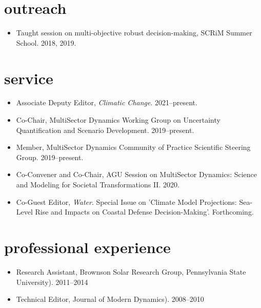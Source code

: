 \documentclass[11pt,article,oneside]{memoir}
\begin{document}

\section{outreach}

\mbox{}\vspace{-\dimexpr\baselineskip\relax}

\begin{itemize}[label={}]

  \item Taught session on multi-objective robust decision-making, SCRiM Summer School. 2018, 2019.

\end{itemize}


\section{service}

\mbox{}\vspace{-\dimexpr\baselineskip\relax}

\begin{itemize}[label={}]

  \item Associate Deputy Editor, \emph{Climatic Change}.  2021--present.

  \item Co-Chair, MultiSector Dynamics Working Group on Uncertainty Quantification and Scenario Development. 2019--present.

  \item Member, MultiSector Dynamics Community of Practice Scientific Steering Group. 2019--present.

  \item Co-Convener and Co-Chair, AGU Session on MultiSector Dynamics: Science and Modeling for Societal Transformations II. 2020.

  \item Co-Guest Editor, \emph{Water}. Special Issue on 'Climate Model Projections: Sea-Level Rise and Impacts on Coastal Defense Decision-Making'. Forthcoming.

\end{itemize}


\section{professional experience}

\mbox{}\vspace{-\dimexpr\baselineskip\relax}

\begin{itemize}[label={}]

  \item Research Assistant, Brownson Solar Research Group, Pennsylvania State University). 2011--2014

  \item Technical Editor, Journal of Modern Dynamics). 2008--2010

\end{itemize}
\end{document}
